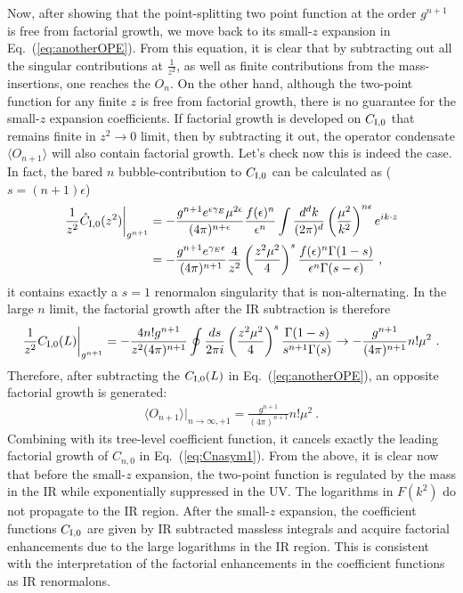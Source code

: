\documentclass[a4paper,11pt]{article}
\begin{document}
Now, after showing that the point-splitting two point function at the order $g^{n+1}$ is free from factorial growth, we move back to its small-$z$ expansion in Eq.~(\ref{eq:anotherOPE}). From this equation, it is clear that by subtracting out all the singular contributions at $\frac{1}{z^2}$, as well as finite contributions from the mass-insertions, one reaches the $O_n$. On the other hand, although the two-point function for any finite $z$ is free from factorial growth, there is no guarantee for the small-$z$ expansion coefficients. If factorial growth is developed on $C_{{\rm I},0}$ that remains finite in $z^2\rightarrow 0$ limit, then by subtracting it out, the operator condensate $\langle O_{n+1}\rangle$ will also contain factorial growth. Let's check now this is indeed the case.  In fact,  the bared $n$ bubble-contribution to $C_{{\rm I},0}$ can be calculated as ($s=(n+1)\epsilon$)
\begin{align}
\frac{1}{z^2}\hat C_{{\rm I},0}(z^2)\bigg|_{g^{n+1}}&=-\frac{g^{n+1}e^{\epsilon\gamma_E}\mu^{2\epsilon}}{(4\pi)^{n+\epsilon}}\frac{f(\epsilon)^n}{\epsilon^n}\int\frac{d^dk}{(2\pi)^d} \left(\frac{\mu^2}{k^2}\right)^{n\epsilon}e^{ik\cdot z}
\nonumber \\&=-\frac{g^{n+1}e^{\gamma_E\epsilon}}{(4\pi)^{n+1}}\frac{4}{z^2}\left(\frac{z^2\mu^2
}{4}\right)^s\frac{f(\epsilon)^n\Gamma(1-s)}{\epsilon^n\Gamma(s-\epsilon)} \ ,
\end{align}
it contains exactly a $s=1$ renormalon singularity that is non-alternating. In the large $n$ limit, the factorial growth after the IR subtraction is therefore
\begin{align}
\frac{1}{z^2} C_{{\rm I},0}(L)\bigg|_{g^{n+1}}=-\frac{4n!g^{n+1}}{z^2(4\pi)^{n+1}}\oint\frac{ds}{2\pi i}\left(\frac{z^2\mu^2}{4}\right)^s\frac{\Gamma(1-s)}{s^{n+1}\Gamma(s)}\rightarrow -\frac{g^{n+1}}{(4\pi)^{n+1}}n!\mu^2 \ .
\end{align}
Therefore, after subtracting the $C_{{\rm I},0}(L)$ in Eq.~(\ref{eq:anotherOPE}), an opposite factorial growth is generated:
\begin{align}
\langle O_{n+1}\rangle\bigg|_{n\rightarrow\infty,+1}=\frac{g^{n+1}}{(4\pi)^{n+1}}n!\mu^2 \ .
\end{align}
Combining with its tree-level coefficient function, it cancels exactly the leading factorial growth of $C_{n,0}$ in Eq.~(\ref{eq:Cnasym1}). From the above, it is clear now that before the small-$z$ expansion, the two-point function is regulated by the mass in the IR while exponentially suppressed in the UV. The logarithms in $F(k^2)$ do not propagate to the IR region. After the small-$z$ expansion, the coefficient functions $C_{{\rm I},0}$ are given by IR subtracted massless integrals and acquire factorial enhancements due to the large logarithms in the IR region. This is consistent with the interpretation of the factorial enhancements in the coefficient functions as IR renormalons. 
\end{document}
